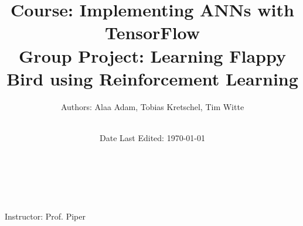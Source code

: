 \title{\Large Course: Implementing ANNs with TensorFlow \\[0.5cm]
        \bfseries\Large Group Project: Learning Flappy Bird using Reinforcement Learning}
\author{\large Authors: Alaa Adam, Tobias Kretschel, Tim Witte\\ \ \\}
\date{\large Date Last Edited: \today}

\makeatletter
    \begin{titlepage}
        \begin{center}
	   {\ \\ \ \\}
        \vbox{}\vspace{5cm}
            {\@title }\\[3cm] 
            {\@author}
            {\large Instructor: Prof. Piper\\ \ \\}

        \end{center}
    \end{titlepage}
\makeatother
